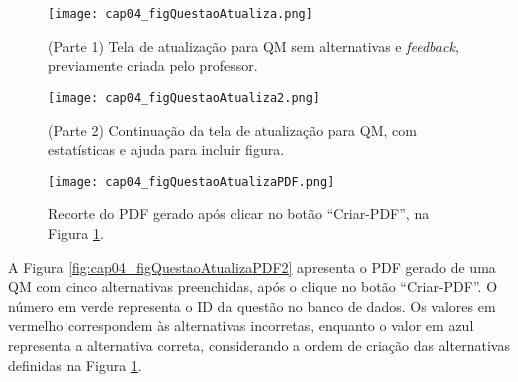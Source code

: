 

\begin{figure}[!ht]
  \centering
  \texttt{[image: cap04\_figQuestaoAtualiza.png]}
  \caption{(Parte 1) Tela de atualização para QM sem alternativas e \textit{feedback}, previamente criada pelo professor.}
  \label{fig:cap04_figQuestaoAtualiza}
\end{figure}

\begin{figure}[!ht]
  \centering
  \texttt{[image: cap04\_figQuestaoAtualiza2.png]}
  \caption{(Parte 2) Continuação da tela de atualização para QM, com estatísticas e ajuda para incluir figura.}
  \label{fig:cap04_figQuestaoAtualiza2}
\end{figure}

\begin{figure}[!ht]
  \texttt{[image: cap04\_figQuestaoAtualizaPDF.png]}
  \caption{Recorte do PDF gerado após clicar no botão ``Criar-PDF'', na Figura \ref{fig:cap04_figQuestaoAtualiza}.}
  \label{fig:cap04_figQuestaoAtualizaPDF}
\end{figure}

A Figura \ref{fig:cap04_figQuestaoAtualizaPDF2} apresenta o PDF gerado de uma QM com cinco alternativas preenchidas, após o clique no botão ``Criar-PDF''. O número em verde representa o ID da questão no banco de dados. Os valores em vermelho correspondem às alternativas incorretas, enquanto o valor em azul representa a alternativa correta, considerando a ordem de criação das alternativas definidas na Figura \ref{fig:cap04_figQuestaoAtualiza}.


